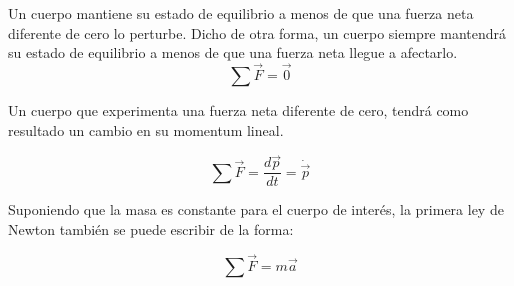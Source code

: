 \documentclass[/home/hernan/Documentos/Apuntes_mecanica_teorica/main.tex]{subfiles}
\begin{document}

	\begin{definition}
		Un cuerpo mantiene su estado de equilibrio a menos de que una fuerza neta diferente de cero lo perturbe. Dicho de otra forma, un cuerpo siempre mantendrá su estado de equilibrio a menos de que una fuerza neta llegue a afectarlo.
		\begin{equation}
			\sum \vec{F} = \vec{0}
			\label{eq: Nfirstlaw}
		\end{equation}
		
	\end{definition}

	
	\begin{definition}
		Un cuerpo que experimenta una fuerza neta diferente de cero, tendrá como resultado un cambio en su momentum lineal.
		
		\begin{equation}
			\sum \vec{F} = \frac{d \vec{p}}{dt} = \dot{\vec{p}}
			\label{eq: NSecondlaw}
		\end{equation}

		Suponiendo que la masa es constante para el cuerpo de interés, la primera ley de Newton también se puede escribir de la forma:

		\begin{equation}
			\sum \vec{F} = m \vec{a}
			\label{eq: NSecondlawmcons}
		\end{equation}
	\end{definition}
\end{document}
